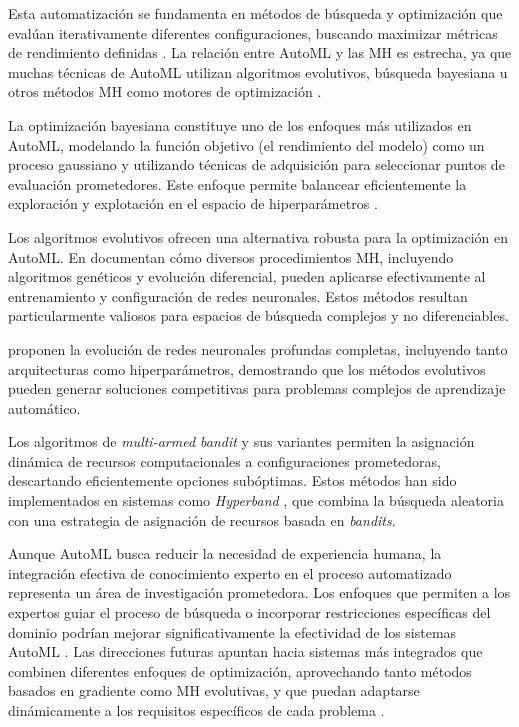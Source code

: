Esta automatización se fundamenta en métodos de búsqueda y optimización que evalúan iterativamente diferentes configuraciones, buscando maximizar métricas de rendimiento definidas \cite{Hutter2019}. La relación entre AutoML y las MH es estrecha, ya que muchas técnicas de AutoML utilizan algoritmos evolutivos, búsqueda bayesiana u otros métodos MH como motores de optimización \cite{Kaveh2023}.

La optimización bayesiana constituye uno de los enfoques más utilizados en AutoML, modelando la función objetivo (el rendimiento del modelo) como un proceso gaussiano y utilizando técnicas de adquisición para seleccionar puntos de evaluación prometedores. Este enfoque permite balancear eficientemente la exploración y explotación en el espacio de hiperparámetros \cite{Shahriari2016}.


Los algoritmos evolutivos ofrecen una alternativa robusta para la optimización en AutoML. En \cite{Alba2006} documentan cómo diversos procedimientos MH, incluyendo algoritmos genéticos y evolución diferencial, pueden aplicarse efectivamente al entrenamiento y configuración de redes neuronales. Estos métodos resultan particularmente valiosos para espacios de búsqueda complejos y no diferenciables.

\cite{Miikkulainen2019} proponen la evolución de redes neuronales profundas completas, incluyendo tanto arquitecturas como hiperparámetros, demostrando que los métodos evolutivos pueden generar soluciones competitivas para problemas complejos de aprendizaje automático.


Los algoritmos de \textit{multi-armed bandit} y sus variantes permiten la asignación dinámica de recursos computacionales a configuraciones prometedoras, descartando eficientemente opciones subóptimas. Estos métodos han sido implementados en sistemas como \textit{Hyperband} \cite{Li2018}, que combina la búsqueda aleatoria con una estrategia de asignación de recursos basada en \textit{bandits}.

Aunque AutoML busca reducir la necesidad de experiencia humana, la integración efectiva de conocimiento experto en el proceso automatizado representa un área de investigación prometedora. Los enfoques que permiten a los expertos guiar el proceso de búsqueda o incorporar restricciones específicas del dominio podrían mejorar significativamente la efectividad de los sistemas AutoML \cite{Hutter2019}. Las direcciones futuras apuntan hacia sistemas más integrados que combinen diferentes enfoques de optimización, aprovechando tanto métodos basados en gradiente como MH evolutivas, y que puedan adaptarse dinámicamente a los requisitos específicos de cada problema \cite{Elsken2019}.












